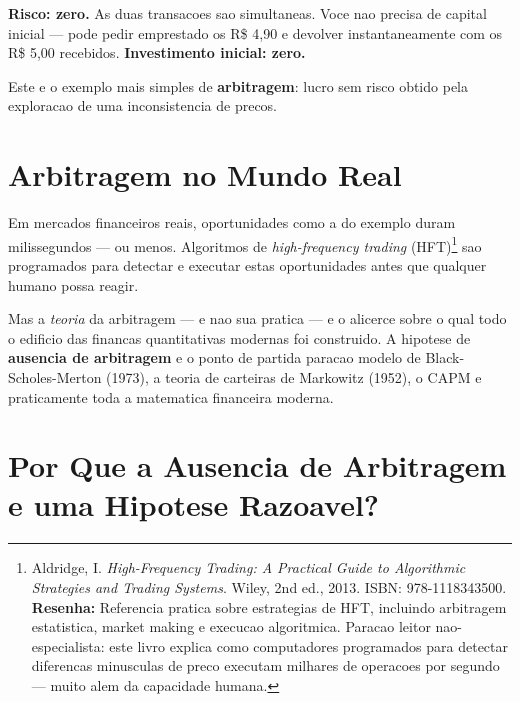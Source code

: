 \textbf{Risco: zero.} As duas transacoes sao simultaneas. Voce nao precisa
de capital inicial --- pode pedir emprestado os R\$ 4,90 e devolver
instantaneamente com os R\$ 5,00 recebidos. \textbf{Investimento inicial:
zero.}

Este e o exemplo mais simples de \textbf{arbitragem}: lucro sem risco obtido
pela exploracao de uma inconsistencia de precos.

\begin{center}
\end{center}

\section{Arbitragem no Mundo Real}

Em mercados financeiros reais, oportunidades como a do exemplo duram
milissegundos --- ou menos. Algoritmos de \textit{high-frequency trading}
(HFT)\footnote{Aldridge, I. \textit{High-Frequency Trading: A Practical Guide
to Algorithmic Strategies and Trading Systems}. Wiley, 2nd ed., 2013. ISBN:
978-1118343500. \textbf{Resenha:} Referencia pratica sobre estrategias de
HFT, incluindo arbitragem estatistica, market making e execucao algoritmica.
Paracao leitor nao-especialista: este livro explica como computadores
programados para detectar diferencas minusculas de preco executam milhares
de operacoes por segundo --- muito alem da capacidade humana.} sao
programados para detectar e executar estas oportunidades antes que qualquer
humano possa reagir.

Mas a \textit{teoria} da arbitragem --- e nao sua pratica --- e o alicerce
sobre o qual todo o edificio das financas quantitativas modernas foi
construido. A hipotese de \textbf{ausencia de arbitragem} e o ponto de
partida paracao modelo de Black-Scholes-Merton (1973), a teoria de carteiras
de Markowitz (1952), o CAPM e praticamente toda a matematica financeira
moderna.

\section{Por Que a Ausencia de Arbitragem e uma Hipotese Razoavel?}

